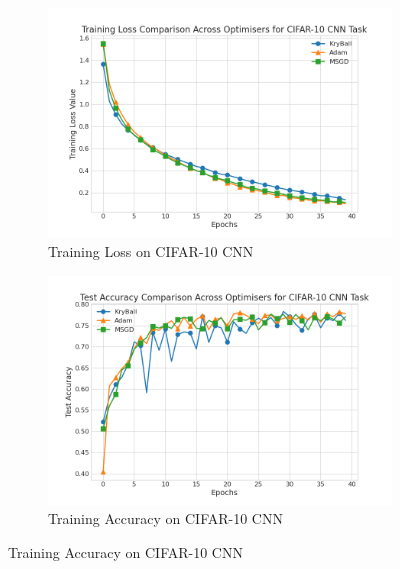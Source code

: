 \begin{figure}[!t]
    \begin{subfigure}[b]{0.45\linewidth}
        \centering
        \includegraphics[width=\linewidth]{figures/5evals/cifar10_cnn_loss.png}
        \caption{Training Loss on CIFAR-10 CNN}
        \label{fig:cifar10_cnn_loss}
    \end{subfigure}
    \hfill
    \begin{subfigure}[b]{0.48\linewidth}
        \centering
        \includegraphics[width=\linewidth]{figures/5evals/cifar10_cnn_acc.png}
        \caption{Training Accuracy on CIFAR-10 CNN}
        \label{fig:cifar10_cnn_acc}
    \end{subfigure}
    
    \vspace{1em}  %
    

\end{figure}
